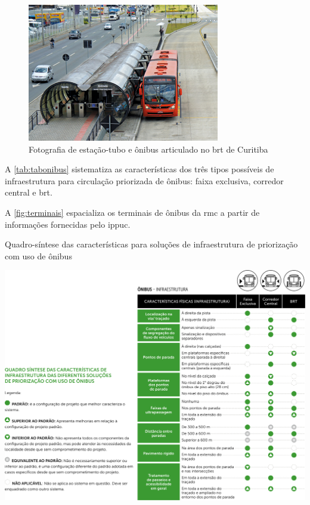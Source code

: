 	\begin{figure}
		\centering
		\caption{Fotografia de estação-tubo e ônibus articulado no \gls{brt} de Curitiba}
		\label{fig:brtsul}
		\includegraphics[width=0.65\linewidth]{img/guiatpc2018a_03}
	\end{figure}

	A \autoref{tab:tabonibus} sistematiza as características dos três tipos possíveis de infraestrutura para circulação priorizada de ônibus: faixa exclusiva, corredor central e \gls{brt}.
	
	A \autoref{fig:terminais} espacializa os terminais de ônibus da \gls{rmc} a partir de informações fornecidas pelo \gls{ippuc}.
	
	\begin{landscape}
		\begin{table}
			\centering
			\caption{Quadro-síntese das características para soluções de infraestrutura de priorização com uso de ônibus}
			\label{tab:tabonibus}
			\includegraphics[width=0.75\linewidth]{img/guiatpc2018a_02}
		\end{table}
	\end{landscape}

